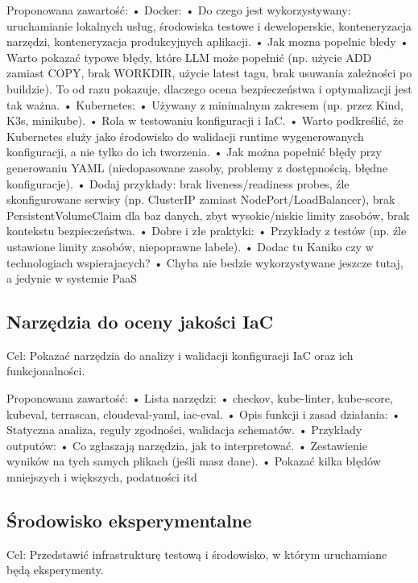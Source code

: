 Proponowana zawartość:
	•	Docker:
	•	    Do czego jest wykorzystywany: uruchamianie lokalnych usług, środowiska testowe i deweloperskie, konteneryzacja narzędzi, konteneryzacja produkcyjnych aplikacji.
	•	    Jak mozna popelnic bledy
	•		Warto pokazać typowe błędy, które LLM może popełnić (np. użycie ADD zamiast COPY, brak WORKDIR, użycie latest tagu, brak usuwania zależności po buildzie). To od razu pokazuje, dlaczego ocena bezpieczeństwa i optymalizacji jest tak ważna.
	•	Kubernetes:
	•	    Używany z minimalnym zakresem (np. przez Kind, K3s, minikube).
	•	    Rola w testowaniu konfiguracji i IaC.
	•		Warto podkreślić, że Kubernetes służy jako środowisko do walidacji runtime wygenerowanych konfiguracji, a nie tylko do ich tworzenia.
	•	    Jak można popełnić błędy przy generowaniu YAML (niedopasowane zasoby, problemy z dostępnością, błędne konfiguracje).
	•		Dodaj przykłady: brak liveness/readiness probes, źle skonfigurowane serwisy (np. ClusterIP zamiast NodePort/LoadBalancer), brak PersistentVolumeClaim dla baz danych, zbyt wysokie/niskie limity zasobów, brak kontekstu bezpieczeństwa.
	•	Dobre i złe praktyki:
	•	    Przykłady z testów (np. źle ustawione limity zasobów, niepoprawne labele).
	•   Dodac tu Kaniko czy w technologiach wspierajacych?
	•	Chyba nie bedzie wykorzystywane jeszcze tutaj, a jedynie w systemie PaaS



\subsection{Narzędzia do oceny jakości IaC}

Cel: Pokazać narzędzia do analizy i walidacji konfiguracji IaC oraz ich funkcjonalności.

Proponowana zawartość:
	•	Lista narzędzi:
	•	    checkov, kube-linter, kube-score, kubeval, terrascan, cloudeval-yaml, iac-eval.
	•	Opis funkcji i zasad działania:
	•	    Statyczna analiza, reguły zgodności, walidacja schematów.
	•	Przykłady outputów:
	•	    Co zgłaszają narzędzia, jak to interpretować.
	•	    Zestawienie wyników na tych samych plikach (jeśli masz dane).
	•		Pokazać kilka błędów mniejszych i większych, podatności itd



\subsection{Środowisko eksperymentalne}

Cel: Przedstawić infrastrukturę testową i środowisko, w którym uruchamiane będą eksperymenty.

